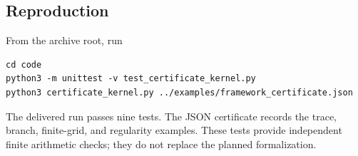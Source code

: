 \subsection{Reproduction}

From the archive root, run
\begin{verbatim}
cd code
python3 -m unittest -v test_certificate_kernel.py
python3 certificate_kernel.py ../examples/framework_certificate.json
\end{verbatim}
The delivered run passes nine tests.  The JSON certificate records the trace,
branch, finite-grid, and regularity examples.  These tests provide independent
finite arithmetic checks; they do not replace the planned 
formalization.
